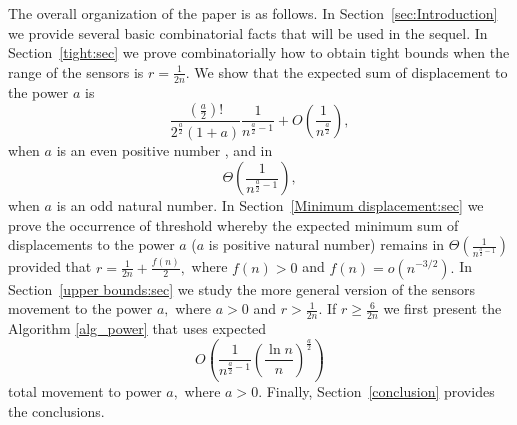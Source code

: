 \documentclass[final,5p,times,twocolumn]{elsarticle_mod}
\begin{document}
The overall organization of the paper is as follows. 
In Section~\ref{sec:Introduction}
we provide several basic combinatorial facts
that will be used in the sequel. In
Section~\ref{tight:sec} we prove combinatorially how
to obtain tight bounds when the range of the sensors 
is $r = \frac{1}{2n}$. 
We show that the expected sum of displacement to the power $a$ is 
$$\frac{\left(\frac{a}{2}\right)!}{2^{\frac{a}{2}}(1+a)}\frac{1}{n^{\frac{a}{2}-1}}+
O\left(\frac{1}{n^{\frac{a}{2}}}\right),$$
when $a$ is an even positive number ,
and in $$\Theta\left(\frac{1}{n^{\frac{a}{2}-1}}\right), $$ when $a$ is an odd natural number.
In
Section~\ref{Minimum displacement:sec}
we prove the occurrence of threshold
whereby the expected minimum sum of
displacements to the power $a$ ($a$ is positive natural number) remains in $\Theta\left(\frac{1}{n^{\frac{a}{2}-1}}\right)$
provided that $r=\frac{1}{2n}+\frac{f(n)}{2},$ where $f(n)>0$ and $f(n)=o(n^{-3/2}).$
In Section~\ref{upper bounds:sec} we
study the more general version of the sensors movement to the power $a,$ where $a>0$ and
$r > \frac{1}{2n}$. If $r\ge\frac{6}{2n}$ we first present the Algorithm \ref{alg_power} that uses expected 
$$O\left(\frac{1}{n^{\frac{a}{2}-1}}\left(\frac{\ln n}{n}\right)^{\frac{a}{2}}\right)$$
total movement to power $a,$ 
where $a>0.$
Finally,
Section~\ref{conclusion}
provides the conclusions. 
\end{document}
